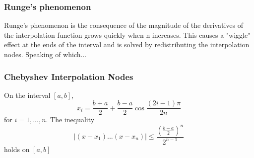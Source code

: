 \subsubsection{Runge's phenomenon}
Runge's phenomenon is the consequence of the magnitude of the derivatives of the interpolation function grows quickly when n increases. This causes a "wiggle" effect at the ends of the interval and is solved by redistributing the interpolation nodes. Speaking of which...

\subsubsection{Chebyshev Interpolation Nodes}
\begin{theorem}
On the interval $[a,b]$,
$$
x_i = \frac{b+a}{2} + \frac{b-a}{2}\cos{\frac{(2i-1)\pi}{2n}}
$$
for $i = 1, ..., n$. The inequality
$$
|(x-x_1)...(x-x_n)| \leq \frac{(\frac{b-a}{2})^n}{2^{n-1}}
$$
holds on $[a,b]$
\end{theorem}